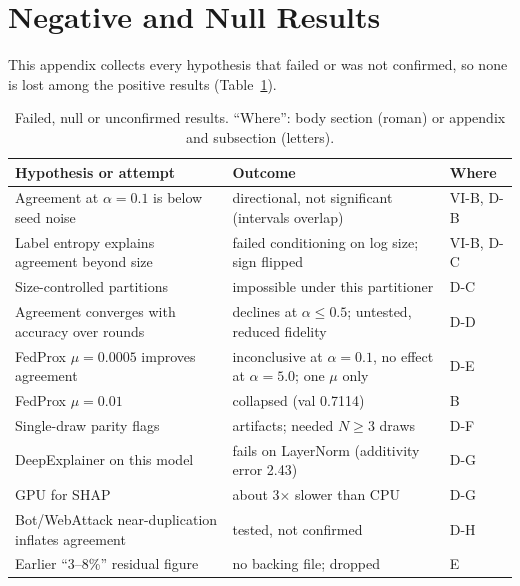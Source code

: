 \section{Negative and Null Results}
\label{app:negative}
This appendix collects every hypothesis that failed or was not confirmed, so none is
lost among the positive results (Table~\ref{tab:negative}).

\begin{table}[t]
\centering
\caption{Failed, null or unconfirmed results. ``Where'': body section (roman) or appendix and subsection (letters).}
\label{tab:negative}
\footnotesize
\begin{tabularx}{\textwidth}{@{}XXl@{}}
\toprule
Hypothesis or attempt & Outcome & Where\\
\midrule
Agreement at $\alpha=0.1$ is below seed noise & directional, not significant (intervals overlap) & VI-B, D-B\\ %
Label entropy explains agreement beyond size & failed conditioning on log size; sign flipped & VI-B, D-C\\
Size-controlled partitions & impossible under this partitioner & D-C\\
Agreement converges with accuracy over rounds & declines at $\alpha\le0.5$; untested, reduced fidelity & D-D\\ %
FedProx $\mu=0.0005$ improves agreement & inconclusive at $\alpha=0.1$, no effect at $\alpha=5.0$; one $\mu$ only & D-E\\ %
FedProx $\mu=0.01$ & collapsed (val 0.7114) & B\\ %
Single-draw parity flags & artifacts; needed $N\ge3$ draws & D-F\\ %
DeepExplainer on this model & fails on LayerNorm (additivity error 2.43) & D-G\\ %
GPU for SHAP & about 3$\times$ slower than CPU & D-G\\ %
Bot/WebAttack near-duplication inflates agreement & tested, not confirmed & D-H\\
Earlier ``3--8\%'' residual figure & no backing file; dropped & E\\ %

\end{tabularx}
\end{table}
